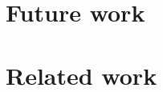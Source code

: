 \documentclass[12pt, oneside]{book}
\begin{document}
\chapter{Future work}


\chapter{Related work}


\clearpage


\end{document}
